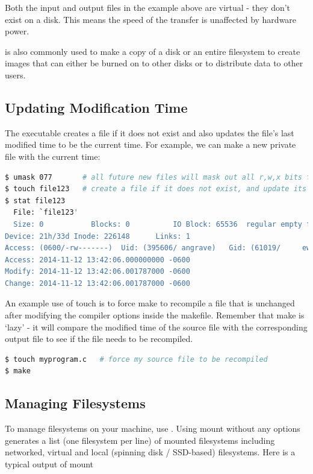 Both the input and output files in the example above are virtual - they don't exist on a disk.
This means the speed of the transfer is unaffected by hardware power.

 is also commonly used to make a copy of a disk or an entire filesystem to create images that can either be burned on to other disks or to distribute data to other users.

\subsection{Updating Modification Time}

The  executable creates a file if it does not exist and also updates the file's last modified time to be the current time.
For example, we can make a new private file with the current time:

\begin{lstlisting}[language=bash]
$ umask 077       # all future new files will mask out all r,w,x bits for group and other access
$ touch file123   # create a file if it does not exist, and update its modified time
$ stat file123
  File: `file123'
  Size: 0           Blocks: 0          IO Block: 65536  regular empty file
Device: 21h/33d Inode: 226148      Links: 1
Access: (0600/-rw-------)  Uid: (395606/ angrave)   Gid: (61019/     ews)
Access: 2014-11-12 13:42:06.000000000 -0600
Modify: 2014-11-12 13:42:06.001787000 -0600
Change: 2014-11-12 13:42:06.001787000 -0600
\end{lstlisting}

An example use of touch is to force make to recompile a file that is unchanged after modifying the compiler options inside the makefile.
Remember that make is `lazy' - it will compare the modified time of the source file with the corresponding output file to see if the file needs to be recompiled.

\begin{lstlisting}[language=bash]
$ touch myprogram.c   # force my source file to be recompiled
$ make
\end{lstlisting}

\subsection{Managing Filesystems}

To manage filesystems on your machine, use .
Using mount without any options generates a list (one filesystem per line) of mounted filesystems including networked, virtual and local (spinning disk / SSD-based) filesystems.
Here is a typical output of mount

